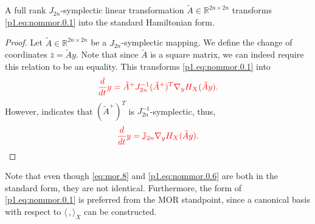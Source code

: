 \begin{lemma} \label{thm:4.2}
A full rank $J_{2n}$-symplectic linear transformation $\tilde A \in \mathbb R^{2n\times 2n}$ transforms \eqref{p1.eq:nommor.0.1} into the standard Hamiltonian form. 
\end{lemma}

\begin{proof}
Let $\tilde A\in \mathbb R^{2n\times 2n}$ be a $J_{2n}$-symplectic mapping. We define the change of coordinates $\bar z = \tilde Ay$. Note that since $\tilde A$ is a square matrix, we can indeed require this relation to be an equality. This transforms \eqref{p1.eq:nommor.0.1} into
\begin{eqnarray} \label{p1.eq:nommor.0.5}
	\edit{ \frac{d}{dt} y = \tilde A^+ J_{2n}^{-1} (\tilde A^+)^T \nabla_y H_X(\tilde Ay).}
\end{eqnarray}
However,  indicates that $(\tilde A^+)^T$ is $J_{2n}^{-1}$-symplectic, thus,
\begin{eqnarray} \label{p1.eq:nommor.0.6}
	\edit{ \frac{d}{dt} y = \mathbb J_{2n} \nabla_y H_X(\tilde Ay).}
\end{eqnarray}
\end{proof}
Note that even though \eqref{eq:mor.8} and \eqref{p1.eq:nommor.0.6} are both in the standard form, they are not identical. Furthermore, the form of \eqref{p1.eq:nommor.0.1} is preferred from the MOR standpoint, since a canonical basis with respect to $\langle\,,\rangle_X$ can be constructed.

